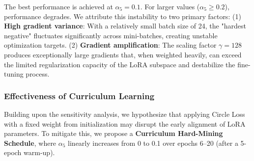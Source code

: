 \documentclass{article}
\begin{document}
\begin{table}[H]
    \centering
    \vspace{-0.5em}
    \caption{Sensitivity analysis of Circle Loss weight ($\alpha_5$) on 3000VnPersonSearch with LoRA enabled (Batch Size = 24).}
    \label{tab:circle_weight}
\end{table}

The best performance is achieved at $\alpha_5=0.1$. For larger values ($\alpha_5 \ge 0.2$), performance degrades. We attribute this instability to two primary factors: (1) \textbf{High gradient variance}: With a relatively small batch size of 24, the "hardest negative" fluctuates significantly across mini-batches, creating unstable optimization targets. (2) \textbf{Gradient amplification}: The scaling factor $\gamma=128$ produces exceptionally large gradients that, when weighted heavily, can exceed the limited regularization capacity of the LoRA subspace and destabilize the fine-tuning process.

\subsubsection{Effectiveness of Curriculum Learning} \label{sec:curriculum_ablation}
Building upon the sensitivity analysis, we hypothesize that applying Circle Loss with a fixed weight from initialization may disrupt the early alignment of LoRA parameters. To mitigate this, we propose a \textbf{Curriculum Hard-Mining Schedule}, where $\alpha_5$ linearly increases from 0 to 0.1 over epochs 6–20 (after a 5-epoch warm-up).
\end{document}

